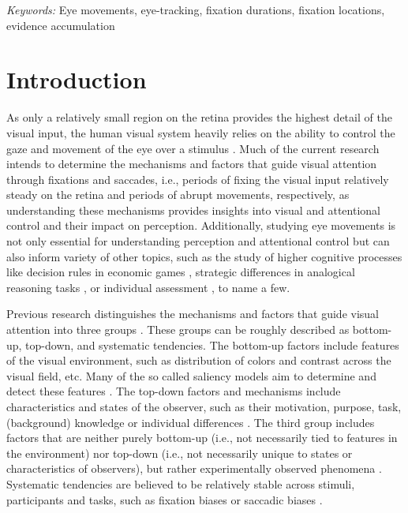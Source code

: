 \documentclass{article}
\begin{document}
\noindent
{\textit{Keywords:} Eye movements, eye-tracking, fixation durations, fixation locations, evidence accumulation}

\section{Introduction}

As only a relatively small region on the retina provides the highest detail of the visual input, the human visual system heavily relies on the ability to control the gaze and movement of the eye over a stimulus \citep{duchowski2007eye}. Much of the current research intends to determine the mechanisms and factors that guide visual attention through fixations and saccades, i.e., periods of fixing the visual input relatively steady on the retina and periods of abrupt movements, respectively, as understanding these mechanisms provides insights into visual and attentional control and their impact on perception. Additionally, studying eye movements is not only essential for understanding perception and attentional control but can also inform variety of other topics, such as the study of higher cognitive processes like decision rules in economic games \citep{polonio2015strategic}, strategic differences in analogical reasoning tasks \citep{hayes2015intelligence,kucharsky2020cognitive}, or individual assessment \citep{chen2014eye}, to name a few.


Previous research distinguishes the mechanisms and factors that guide visual attention into three groups \citep{itti2015computational,schutt2017likelihood,tatler2008systematic}. These groups can be roughly described as bottom-up, top-down, and systematic tendencies. The bottom-up factors include features of the visual environment, such as distribution of colors and contrast across the visual field, etc. Many of the so called saliency models aim to determine and detect these features \citep{itti2001computational,tatler2011salience,xu2014beyond}. The top-down factors and mechanisms include characteristics and states of the observer, such as their motivation, purpose, task, (background) knowledge or individual differences \citep{de2019individual}. The third group includes factors that are neither purely bottom-up (i.e., not necessarily tied to features in the environment) nor top-down (i.e., not necessarily unique to states or characteristics of observers), but rather experimentally observed phenomena \citep{tatler2008systematic}. Systematic tendencies are believed to be relatively stable across stimuli, participants and tasks, such as fixation biases \citep[e.g., central bias; ][]{tatler2007central,tseng2009quantifying,renswoude2019central} or saccadic biases \citep[e.g., horizontal and leftward bias; ][]{le_meur2015saccadic,renswoude2016horizontal,foulsham2013leftward,foulsham2018stable}.
\end{document}
